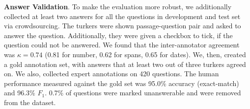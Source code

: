 \textbf{Answer Validation}. 
To make the evaluation more robust, we additionally collected at least two answers for all the questions in development and test set via crowdsourcing. The turkers were shown passage-question pair and asked to answer the question. Additionally, they were given a checkbox to tick, if the question could not be answered. We found that the inter-annotator agreement was $\kappa=0.74$ (0.81 for number, 0.62 for spans, 0.65 for dates). We, then, created a gold annotation set, with answers that at least two out of three turkers agreed on. We also, collected expert annotations on 420 questions. The human performance measured against the gold set was 95.0\% accuracy (exact-match) and 96.3\% $F_1$. 0.7\% of questions were marked unanswerable and were removed from the dataset.



